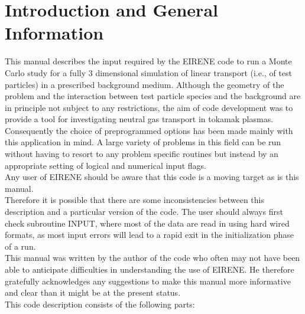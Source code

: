 \chapter{Introduction and General Information} \label{intro}


This manual describes the input required by the EIRENE
code to run a Monte Carlo study for a fully 3 dimensional simulation of
linear transport (i.e., of test particles) in a prescribed background
medium. Although the geometry of the problem and the interaction between
test particle species and the background are in principle not subject to
any restrictions, the aim of code development was to provide a tool
for investigating neutral gas transport in tokamak plasmas. Consequently
the choice of preprogrammed options has been made mainly with this
application in mind. A large variety of problems in this field can be
run
without having to resort to any problem specific routines but instead by
an appropriate setting of logical and numerical input flags. \\
Any user of EIRENE should be aware that this
 code is a moving target as is this manual.\\
Therefore it is possible that there are some inconsistencies
between this description and a particular version of the code.
The user should always
first check subroutine INPUT, where most of the data
are read in using hard wired formats, as most input errors will
lead to a rapid exit in the initialization phase of a run.\\
This manual was written by the author of the code
who often may not have been
able to anticipate difficulties in understanding the use of EIRENE. He
therefore gratefully acknowledges any suggestions to make this manual
more informative and clear than it might be at the present status.\\
This code description consists of the following parts:\\

